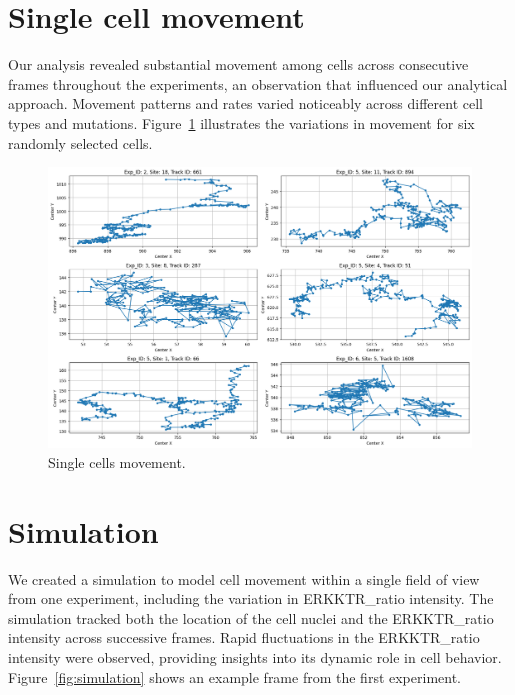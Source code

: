 \documentclass[licencjacka,en]{pracamgr}
\begin{document}
\section{Single cell movement}

Our analysis revealed substantial movement among cells across consecutive frames throughout the experiments, an observation that influenced our analytical approach. Movement patterns and rates varied noticeably across different cell types and mutations. Figure~\ref{fig:single_cell} illustrates the variations in movement for six randomly selected cells.

\begin{figure}[ht]
    \centering
    \includegraphics[width=1\textwidth]{images/single_cell_movement.png}
    \caption{Single cells movement.}
    \label{fig:single_cell}
\end{figure} 

\section{Simulation}

We created a simulation to model cell movement within a single field of view from one experiment, including the variation in ERKKTR\_ratio intensity. The simulation tracked both the location of the cell nuclei and the ERKKTR\_ratio intensity across successive frames. Rapid fluctuations in the ERKKTR\_ratio intensity were observed, providing insights into its dynamic role in cell behavior.
Figure~\ref{fig:simulation} shows an example frame from the first experiment.
\end{document}
